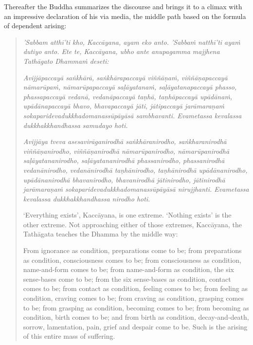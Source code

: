 Thereafter the Buddha summarizes the discourse and brings it to a climax with an impressive declaration of his via media, the middle path based on the formula of dependent arising:

\begin{quote}
\emph{'Sabbam atthī'ti kho, Kaccāyana, ayam eko anto. 'Sabbaṁ natthī'ti ayaṁ dutiyo anto. Ete te, Kaccāyana, ubho ante anupagamma majjhena Tathāgato Dhammaṁ deseti:}

\emph{Avijjāpaccayā saṅkhārā, saṅkhārapaccayā viññāṇaṁ, viññāṇapaccayā nāmarūpaṁ, nāmarūpapaccayā saḷāyatanaṁ, saḷāyatanapaccayā phasso, phassapaccayā vedanā, vedanāpaccayā taṇhā, taṇhāpaccayā upādānaṁ, upādānapaccayā bhavo, bhavapaccayā jāti, jātipaccayā jarāmaraṇaṁ sokaparidevadukkhadomanassūpāyāsā sambhavanti. Evametassa kevalassa dukkhakkhandhassa samudayo hoti.}

\emph{Avijjāya tveva asesavirāganirodhā saṅkhāranirodho, saṅkharanirodhā viññāṇanirodho, viññāṇanirodhā nāmarūpanirodho, nāmarūpanirodhā saḷāyatananirodho, saḷāyatananirodhā phassanirodho, phassanirodhā vedanānirodho, vedanānirodhā taṇhānirodho, taṇhānirodhā upādānanirodho, upādānanirodhā bhavanirodho, bhavanirodhā jātinirodho, jātinirodhā jarāmaraṇaṁ sokaparidevadukkhadomanassūpāyāsā nirujjhanti. Evametassa kevalassa dukkhakkhandhassa nirodho hoti}.

`Everything exists', Kaccāyana, is one extreme. `Nothing exists' is the other extreme. Not approaching either of those extremes, Kaccāyana, the Tathāgata teaches the Dhamma by the middle way:

From ignorance as condition, preparations come to be; from preparations as condition, consciousness comes to be; from consciousness as condition, name-and-form comes to be; from name-and-form as condition, the six sense-bases come to be; from the six sense-bases as condition, contact comes to be; from contact as condition, feeling comes to be; from feeling as condition, craving comes to be; from craving as condition, grasping comes to be; from grasping as condition, becoming comes to be; from becoming as condition, birth comes to be; and from birth as condition, decay-and-death, sorrow, lamentation, pain, grief and despair come to be. Such is the arising of this entire mass of suffering.


\end{quote}
